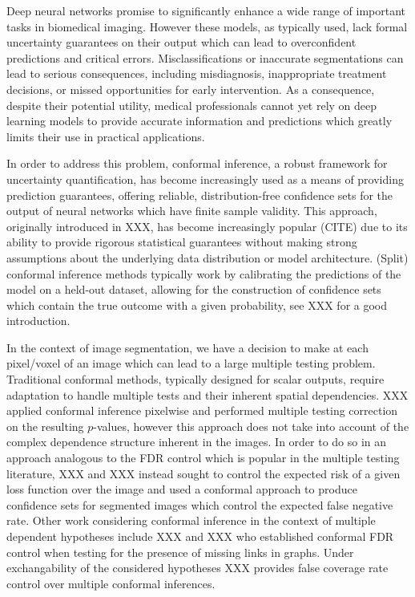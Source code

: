 


Deep neural networks promise to significantly enhance a wide range of important tasks in biomedical imaging. However these models, as typically used, lack formal uncertainty guarantees on their output which can lead to overconfident predictions and critical errors. Misclassifications or inaccurate segmentations can lead to serious consequences, including misdiagnosis, inappropriate treatment decisions, or missed opportunities for early intervention.  As a consequence, despite their potential utility, medical professionals cannot yet rely on deep learning models to provide accurate information and predictions which greatly limits their use in practical applications. 

In order to address this problem, conformal inference, a robust framework for uncertainty quantification, has become increasingly used as a means of providing prediction guarantees, offering reliable, distribution-free confidence sets for the output of neural networks which have finite sample validity. This approach, originally introduced in XXX, has become increasingly popular (CITE) due to its ability to provide rigorous statistical guarantees without making strong assumptions about the underlying data distribution or model architecture. (Split) conformal inference methods typically work by calibrating the predictions of the model on a held-out dataset, allowing for the construction of confidence sets which contain the true outcome with a given probability, see XXX for a good introduction.

In the context of image segmentation, we have a decision to make at each pixel/voxel of an image which can lead to a large multiple testing problem. Traditional conformal methods, typically designed for scalar outputs, require adaptation to handle multiple tests and their inherent spatial dependencies. XXX applied conformal inference pixelwise and performed multiple testing correction on the resulting $p$-values, however this approach does not take into account of the complex dependence structure inherent in the images. In order to do so in an approach analogous to the FDR control which is popular in the multiple testing literature, XXX and XXX instead sought to control the expected risk of a given loss function over the image and used a conformal approach to produce confidence sets for segmented images which control the expected false negative rate. Other work considering conformal inference in the context of multiple dependent hypotheses include XXX and XXX who established conformal FDR control when testing for the presence of missing links in graphs. Under exchangability of the considered hypotheses XXX provides false coverage rate control over multiple conformal inferences.

